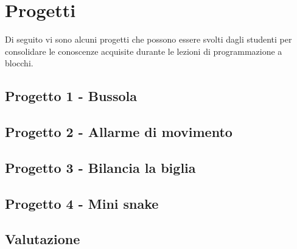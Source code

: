 \documentclass[../../docenti.tex]{subfiles}
\begin{document}
\section{Progetti}
Di seguito vi sono alcuni progetti che possono essere svolti dagli studenti per consolidare le conoscenze acquisite durante le lezioni di programmazione a blocchi.

\subsection{Progetto 1 - Bussola}


\subsection{Progetto 2 - Allarme di movimento}

\subsection{Progetto 3 - Bilancia la biglia}

\subsection{Progetto 4 - Mini snake}

\subsection{Valutazione}
\end{document}
